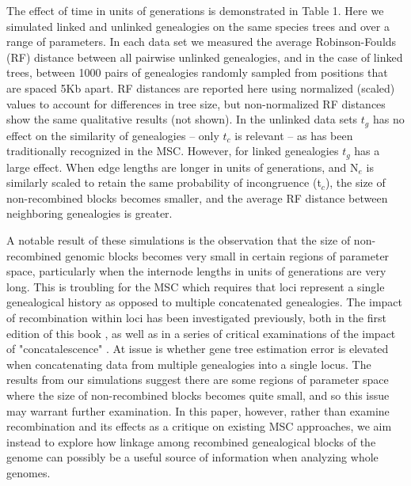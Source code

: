 \documentclass[11pt]{article}
\begin{document}
The effect of time in units of generations is demonstrated in Table 1. Here we simulated linked and unlinked genealogies on the same species trees and over a range of parameters. In each data set we measured the average Robinson-Foulds (RF) distance between all pairwise unlinked genealogies, and in the case of linked trees, between 1000 pairs of genealogies randomly sampled from positions that are spaced 5Kb apart. RF distances are reported here using normalized (scaled) values to account for differences in tree size, but non-normalized RF distances show the same qualitative results (not shown). In the unlinked data sets $t_g$ has no effect on the similarity of genealogies -- only $t_c$ is relevant -- as has been traditionally recognized in the MSC. However, for linked genealogies $t_g$ has a large effect. When edge lengths are longer in units of generations, and N$_e$ is similarly scaled to retain the same probability of incongruence (t$_c$), the size of non-recombined blocks becomes smaller, and the average RF distance between neighboring genealogies is greater. 

A notable result of these simulations is the observation that the size of non-recombined genomic blocks becomes very small in certain regions of parameter space, particularly when the internode lengths in units of generations are very long. This is troubling for the MSC which requires that loci represent a single genealogical history as opposed to multiple concatenated genealogies. The impact of recombination within loci has been investigated previously, both in the first edition of this book \citep{castillo-ramirez_bayesian_2010}, as well as in a series of critical examinations of the impact of "concatalescence" \citep{springer_gene_2016}. At issue is whether gene tree estimation error is elevated when concatenating data from multiple genealogies into a single locus. The results from our simulations suggest there are some regions of parameter space where the size of non-recombined blocks becomes quite small, and so this issue may warrant further examination. In this paper, however, rather than examine recombination and its effects as a critique on existing MSC approaches, we aim instead to explore how linkage among recombined genealogical blocks of the genome can possibly be a useful source of information when analyzing whole genomes. 
\end{document}
